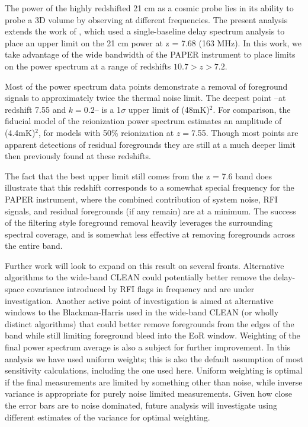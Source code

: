 \documentclass[preprint2]{aastex}
\begin{document}
The power of the highly redshifted 21 cm as a cosmic probe lies in its ability to probe a 3D volume by observing at different frequencies.  The present analysis extends the work of  \cite{Parsons:2014p10499}, which used a single-baseline delay spectrum analysis to place an upper limit on the 21 cm power at z = 7.68 (163 MHz).  In this work, we take advantage of the wide bandwidth of the PAPER instrument to place limits on the power spectrum at a range of redshifts $10.7>z>7.2$.  

Most of the power spectrum data points demonstrate a removal of foreground signals to approximately twice the thermal noise limit. The deepest point --at redshift 7.55 and $k=0.2$-- is a 1$\sigma$ upper limit of (48mK)$^2$. For comparison, the \citet{Lidz:2008p8251} fiducial model of the reionization power spectrum estimates an amplitude of (4.4mK)$^2$, for models with 50\% reionization at $z=$7.55.  Though most points are apparent detections of residual foregrounds they are still at a much deeper limit then previously found at these redshifts.

The fact that the best upper limit still comes from the z = 7.6 band does illustrate that this redshift corresponds to a somewhat special frequency for the PAPER instrument, where the combined contribution of system noise, RFI signals, and residual foregrounds (if any remain) are at a minimum.  The success of the filtering style foreground removal heavily leverages the surrounding spectral coverage, and is somewhat less effective at removing foregrounds across the entire band. 

Further work will look to expand on this result on several fronts.  Alternative algorithms to the wide-band CLEAN could potentially better remove the delay-space covariance introduced by RFI flags in frequency and are under investigation.  Another active point of investigation is aimed at alternative windows to the Blackman-Harris used in the wide-band CLEAN (or wholly distinct algorithms) that could better remove foregrounds from the edges of the band while still limiting foreground bleed into the EoR window.  Weighting of the final power spectrum average is also a subject for further improvement.   In this analysis we have used uniform weights; this is also the default assumption of most sensitivity calculations, including the one used here.  Uniform weighting is optimal if the final measurements are limited by something other than noise, while inverse variance is appropriate for purely noise limited measurements.  Given how close the error bars are to noise dominated, future analysis will investigate using different estimates of the variance for optimal weighting.
\end{document}
